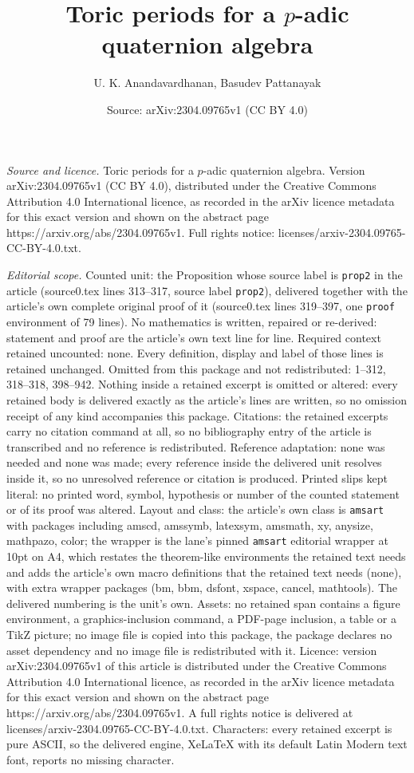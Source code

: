 \documentclass[10pt,a4paper]{amsart}
\title[Toric periods for a $p$-adic quaternion algebra]{Toric periods for a $p$-adic quaternion algebra}
\author{U. K. Anandavardhanan, Basudev Pattanayak}
\date{Source: arXiv:2304.09765v1 (CC BY 4.0)}
\begin{document}
\maketitle

\noindent\emph{Source and licence.} Toric periods for a $p$-adic quaternion algebra. Version arXiv:2304.09765v1 (CC BY 4.0), distributed under the Creative Commons Attribution 4.0 International licence, as recorded in the arXiv licence metadata for this exact version and shown on the abstract page https://arxiv.org/abs/2304.09765v1. Full rights notice: licenses/arxiv-2304.09765-CC-BY-4.0.txt.\par\smallskip

\noindent\textit{Editorial scope.} Counted unit: the Proposition whose source label is \texttt{prop2} in the article (source0.tex lines 313--317, source label \texttt{prop2}), delivered together with the article's own complete original proof of it (source0.tex lines 319--397, one \texttt{proof} environment of 79 lines). No mathematics is written, repaired or re-derived: statement and proof are the article's own text line for line. Required context retained uncounted: none. Every definition, display and label of those lines is retained unchanged. Omitted from this package and not redistributed: 1--312, 318--318, 398--942. Nothing inside a retained excerpt is omitted or altered: every retained body is delivered exactly as the article's lines are written, so no omission receipt of any kind accompanies this package. Citations: the retained excerpts carry no citation command at all, so no bibliography entry of the article is transcribed and no reference is redistributed. Reference adaptation: none was needed and none was made; every reference inside the delivered unit resolves inside it, so no unresolved reference or citation is produced. Printed slips kept literal: no printed word, symbol, hypothesis or number of the counted statement or of its proof was altered. Layout and class: the article's own class is \texttt{amsart} with packages including amscd, amssymb, latexsym, amsmath, xy, anysize, mathpazo, color; the wrapper is the lane's pinned \texttt{amsart} editorial wrapper at 10pt on A4, which restates the theorem-like environments the retained text needs and adds the article's own macro definitions that the retained text needs (none), with extra wrapper packages (bm, bbm, dsfont, xspace, cancel, mathtools). The delivered numbering is the unit's own. Assets: no retained span contains a figure environment, a graphics-inclusion command, a PDF-page inclusion, a table or a TikZ picture; no image file is copied into this package, the package declares no asset dependency and no image file is redistributed with it. Licence: version arXiv:2304.09765v1 of this article is distributed under the Creative Commons Attribution 4.0 International licence, as recorded in the arXiv licence metadata for this exact version and shown on the abstract page https://arxiv.org/abs/2304.09765v1. A full rights notice is delivered at licenses/arxiv-2304.09765-CC-BY-4.0.txt. Characters: every retained excerpt is pure ASCII, so the delivered engine, XeLaTeX with its default Latin Modern text font, reports no missing character.
\end{document}

